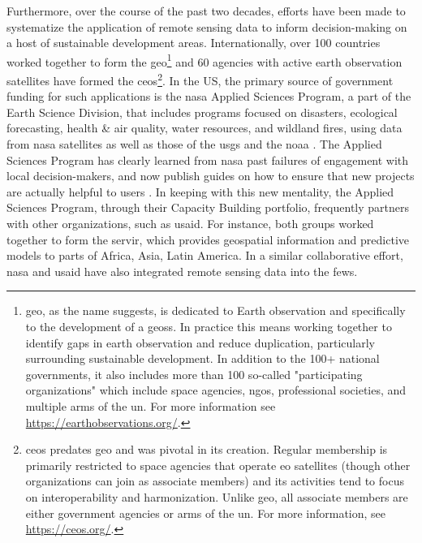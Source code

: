 Furthermore, over the course of the past two decades, efforts have been made to systematize the application of remote sensing data to inform decision-making on a host of sustainable development areas. Internationally, over 100 countries worked together to form the \ac{geo}\footnote{\ac{geo}, as the name suggests, is dedicated to Earth observation and specifically to the development of a \ac{geoss}. In practice this means working together to identify gaps in earth observation and reduce duplication, particularly surrounding sustainable development. In addition to the 100+ national governments, it also includes more than 100 so-called "participating organizations" which include space agencies, \acp{ngo}, professional societies, and multiple arms of the \ac{un}. For more information see \url{https://earthobservations.org/}.} and 60 agencies with active earth observation satellites have formed the \ac{ceos}\footnote{\ac{ceos} predates \ac{geo} and was pivotal in its creation. Regular membership is primarily restricted to space agencies that operate \ac{eo} satellites (though other organizations can join as associate members) and its activities tend to focus on interoperability and harmonization. Unlike \ac{geo}, all associate members are either government agencies or arms of the \ac{un}. For more information, see \url{https://ceos.org/}.}. In the US, the primary source of government funding for such applications is the \ac{nasa} Applied Sciences Program, a part of the Earth Science Division, that includes programs focused on disasters, ecological forecasting, health \& air quality, water resources, and wildland fires, using data from \ac{nasa} satellites as well as those of the \ac{usgs} and the \ac{noaa} \cite{khanLongHardJourney2009, nasaappliedsciencesprogramWhatWeNASA, nasaearthscienceappliedsciencesNASAAppliedSciences2021}. The Applied Sciences Program has clearly learned from \ac{nasa} past failures of engagement with local decision-makers, and now publish guides on how to ensure that new projects are actually helpful to users \cite{irwinSERVIRServicePlanning2017}. In keeping with this new mentality, the Applied Sciences Program, through their Capacity Building portfolio, frequently partners with other organizations, such as \ac{usaid}. For instance, both groups worked together to form the \ac{servir}, which provides geospatial information and predictive models to parts of Africa, Asia, Latin America. In a similar collaborative effort, \ac{nasa} and \ac{usaid} have also integrated remote sensing data into the \ac{fews}. 

